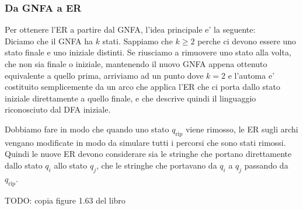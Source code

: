 \subsubsection{Da GNFA a ER}
Per ottenere l'ER a partire dal GNFA, l'idea principale e' la seguente:\\
Diciamo che il GNFA ha $ k $ stati. Sappiamo che $ k \geq 2 $ perche ci devono essere uno stato finale e uno iniziale distinti. Se riusciamo a rimuovere uno stato alla volta, che non sia finale o iniziale, mantenendo il nuovo GNFA appena ottenuto equivalente a quello prima, arriviamo ad un punto dove $ k=2 $ e l'automa e' costituito semplicemente da un arco che applica l'ER che ci porta dallo stato iniziale direttamente a quello finale, e che descrive quindi il linguaggio riconosciuto dal DFA iniziale.

Dobbiamo fare in modo che quando uno stato $ q_{\text{rip}} $ viene rimosso, le ER sugli archi vengano modificate in modo da simulare tutti i percorsi che sono stati rimossi. Quindi le nuove ER devono considerare sia le stringhe che portano direttamente dallo stato $ q_i $ allo stato $ q_j $, che le stringhe che portavano da $ q_i $ a $ q_j $ passando da $ q_{\text{rip}} $.

TODO: copia figure 1.63 del libro

